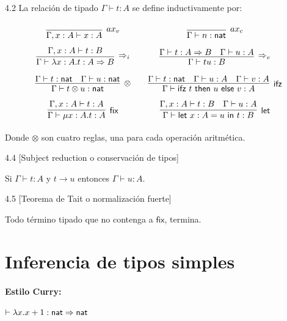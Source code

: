 \documentclass[twoside,a4paper,12pt]{article}
\theoremstyle{definition}
\theoremstyle{remark}
\begin{document}
\begin{definicion}{4.2}
  \label{def:ST}
  La relación de tipado $\Gamma\vdash t:A$ se define inductivamente por:
  \[\arraycolsep=10pt\def\arraystretch{2.6}
    \begin{array}{cc}
      \infer[ax_v]
      {\Gamma,x:A\vdash x:A}
      {}
      &
        \infer[ax_c]
        {\Gamma\vdash n:\nat}
        {}
      \\
      \infer[\Rightarrow_i]
      {\Gamma\vdash\fun{x:A}t:A\Rightarrow B}
      {\Gamma,x:A\vdash t:B}
      &
        \infer[\Rightarrow_e]
        {\Gamma\vdash tu:B}
        {\Gamma\vdash t:A\Rightarrow B & \Gamma\vdash u:A}
      \\
      \infer[\otimes]
      {\Gamma\vdash t\otimes u:\nat}
      {\Gamma\vdash t:\nat & \Gamma\vdash u:\nat}
      &
        \infer[\mathsf{ifz}]
        {\Gamma\vdash\ifz tuv:A}
        {\Gamma\vdash t:\nat & \Gamma\vdash u:A & \Gamma\vdash v:A}
      \\
      \infer[\mathsf{fix}]
      {\Gamma\vdash\fix{x:A}t:A}
      {\Gamma,x:A\vdash t:A}
      &
        \infer[\mathsf{let}]
        {\Gamma\vdash\letl{x:A}ut:B}
        {\Gamma,x:A\vdash t:B & \Gamma\vdash u:A}
    \end{array}
  \]
  Donde $\otimes$ son cuatro reglas, una para cada operación aritmética.
\end{definicion}

\begin{teorema}{4.4}
  [Subject reduction o conservación de tipos]
  \label{thm:SR}
  ~

  Si $\Gamma\vdash t:A$ y $t\to u$ entonces $\Gamma\vdash u:A$.
\end{teorema}

\begin{teorema}{4.5}
  [Teorema de Tait o normalización fuerte]
  \label{thm:SN}
  ~

  Todo término tipado que no contenga a $\mathsf{fix}$, termina.
\end{teorema}

\newpage
\section*{Inferencia de tipos simples}

\paragraph{Estilo Curry:} $\vdash\lambda {x}{.}{x+1}:\mathsf{nat}\Rightarrow\mathsf{nat}$
\end{document}
